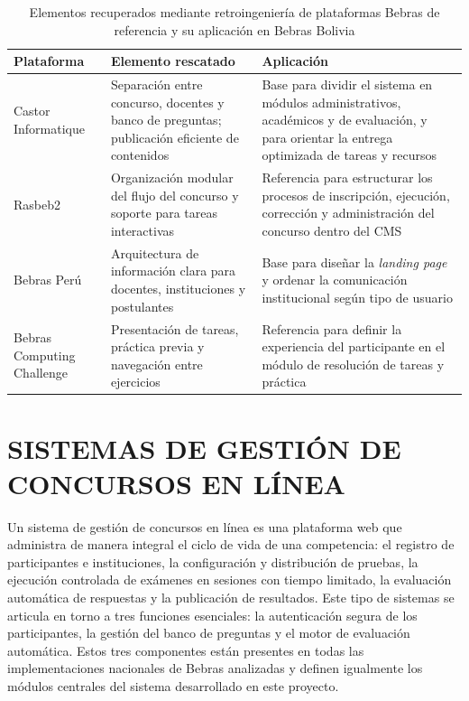 \begin{table}[H]
\centering
\caption[Elementos recuperados de plataformas Bebras de referencia]{Elementos recuperados mediante retroingeniería de plataformas Bebras de referencia y su aplicación en Bebras Bolivia}
\label{tab:retro_bebras}
\renewcommand{\arraystretch}{1.25}
\begin{tabular}{|p{3.5cm}|p{4.8cm}|p{6cm}|}
\hline
\textbf{Plataforma} & \textbf{Elemento rescatado} & \textbf{Aplicación} \\ \hline
Castor Informatique & Separación entre concurso, docentes y banco de preguntas; publicación eficiente de contenidos & Base para dividir el sistema en módulos administrativos, académicos y de evaluación, y para orientar la entrega optimizada de tareas y recursos \\ \hline
Rasbeb2 & Organización modular del flujo del concurso y soporte para tareas interactivas & Referencia para estructurar los procesos de inscripción, ejecución, corrección y administración del concurso dentro del CMS \\ \hline
Bebras Perú & Arquitectura de información clara para docentes, instituciones y postulantes & Base para diseñar la \emph{landing page} y ordenar la comunicación institucional según tipo de usuario \\ \hline
Bebras Computing Challenge & Presentación de tareas, práctica previa y navegación entre ejercicios & Referencia para definir la experiencia del participante en el módulo de resolución de tareas y práctica \\ \hline
\end{tabular}
\end{table}

\section{SISTEMAS DE GESTIÓN DE CONCURSOS EN LÍNEA}

Un sistema de gestión de concursos en línea es una plataforma web que administra de manera integral el ciclo de vida de una competencia: el registro de participantes e instituciones, la configuración y distribución de pruebas, la ejecución controlada de exámenes en sesiones con tiempo limitado, la evaluación automática de respuestas y la publicación de resultados. Este tipo de sistemas se articula en torno a tres funciones esenciales: la autenticación segura de los participantes, la gestión del banco de preguntas y el motor de evaluación automática. Estos tres componentes están presentes en todas las implementaciones nacionales de Bebras analizadas y definen igualmente los módulos centrales del sistema desarrollado en este proyecto.

